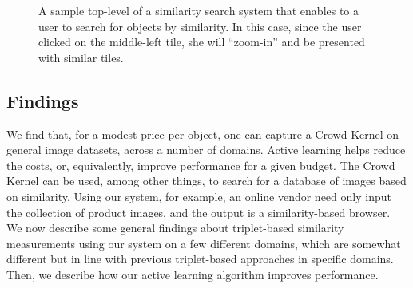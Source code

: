 \documentclass{article}
\begin{document}
\begin{figure}
 \caption{\label{fig:tilestree} A sample top-level of a similarity search system that enables to a user to search for objects by similarity.  In this case, since the user clicked on the middle-left tile, she will ``zoom-in'' and be presented with similar tiles.}
\end{figure}

\subsection{Findings}
We find that, for a modest price per object, one can capture a Crowd Kernel on general image datasets, across a number of domains.   Active learning helps reduce the costs, or, equivalently, improve performance for a given budget. The Crowd Kernel can be used, among other things, to search for a database of images based on similarity.  Using our system, for example, an online vendor need only input the collection of product images, and the output is a similarity-based browser.  We now describe some general findings about triplet-based similarity measurements using our system on a few different domains, which are somewhat different but in line with previous triplet-based approaches in specific domains.  Then, we describe how our active learning algorithm improves performance.
\end{document}
